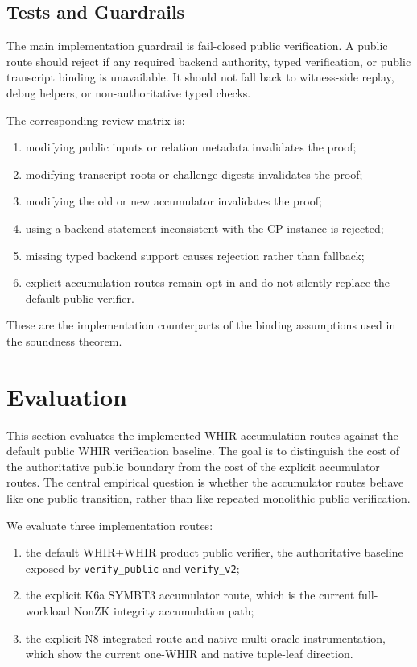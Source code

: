 \documentclass[11pt]{article}
\theoremstyle{definition}
\begin{document}
\subsection{Tests and Guardrails}
\label{sec:tests-and-guardrails}

The main implementation guardrail is fail-closed public verification. A public
route should reject if any required backend authority, typed verification, or
public transcript binding is unavailable. It should not fall back to witness-side
replay, debug helpers, or non-authoritative typed checks.

The corresponding review matrix is:
\begin{enumerate}
  \item modifying public inputs or relation metadata invalidates the proof;
  \item modifying transcript roots or challenge digests invalidates the proof;
  \item modifying the old or new accumulator invalidates the proof;
  \item using a backend statement inconsistent with the CP instance is rejected;
  \item missing typed backend support causes rejection rather than fallback;
  \item explicit accumulation routes remain opt-in and do not silently replace
        the default public verifier.
\end{enumerate}

These are the implementation counterparts of the binding assumptions used in the
soundness theorem.
\section{Evaluation}
\label{sec:evaluation}

This section evaluates the implemented WHIR accumulation routes against the
default public WHIR verification baseline. The goal is to distinguish the
cost of the authoritative public boundary from the cost of the explicit
accumulator routes. The central empirical question is whether the accumulator
routes behave like one public transition, rather than like repeated monolithic
public verification.

We evaluate three implementation routes:
\begin{enumerate}
  \item the default WHIR+WHIR product public verifier, the authoritative
        baseline exposed by \texttt{verify\_public} and \texttt{verify\_v2};
  \item the explicit K6a SYMBT3 accumulator route, which is the current
        full-workload NonZK integrity accumulation path;
  \item the explicit N8 integrated route and native multi-oracle instrumentation,
        which show the current one-WHIR and native tuple-leaf direction.
\end{enumerate}
\end{document}
